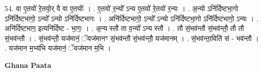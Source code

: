 \documentclass[17pt]{extarticle}
\begin{document}
54. वा ए॒तयो॑ रे॒तयो॒र् वै वा ए॒तयोः᳚ । . ए॒तयो॑ र॒न्यो᳚ ऽन्य ए॒तयो॑ रे॒तयो॑ र॒न्यः । . अ॒न्यो ऽनि॑र्दिष्टभा॒गो ऽनि॑र्दिष्टभागो॒ ऽन्यो᳚ ऽन्यो ऽनि॑र्दिष्टभागः । . अनि॑र्दिष्टभागो॒ ऽन्यो᳚ ऽन्यो ऽनि॑र्दिष्टभा॒गो ऽनि॑र्दिष्टभागो॒ ऽन्यः । . अनि॑र्दिष्टभाग॒ इत्यनि॑र्दिष्ट - भा॒गः॒ । . अ॒न्य स्तौ ता व॒न्यो᳚ ऽन्य स्तौ । . तौ सं॒भव॑न्तौ सं॒भव॑न्तौ॒ तौ तौ सं॒भव॑न्तौ । . सं॒भव॑न्तौ॒ यज॑मानं॒ ॅयज॑मानꣳ सं॒भव॑न्तौ सं॒भव॑न्तौ॒ यज॑मानम् । . सं॒भव॑न्ता॒विति॑ सं - भव॑न्तौ । . यज॑मान म॒भ्य॑भि यज॑मानं॒ ॅयज॑मान म॒भि । \newline

\textbf{Ghana Paata } \newline
\end{document}
